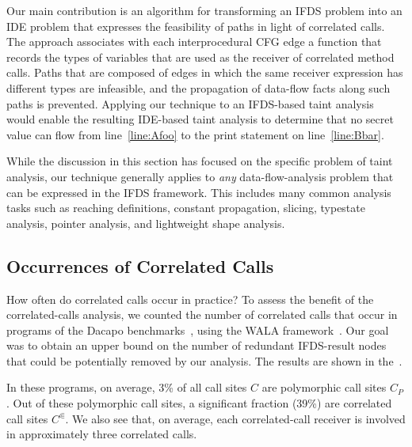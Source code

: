 Our main contribution is an algorithm for transforming an IFDS problem 
into an IDE problem that expresses the feasibility of paths
in light of correlated calls.
The approach associates with each interprocedural CFG edge 
a function that records the types of 
variables that are used as the receiver of correlated method calls. Paths that 
are composed of edges in which the same receiver expression has different types
are infeasible, and the propagation of data-flow facts along such paths is
prevented. Applying our technique to an IFDS-based taint analysis would enable
the resulting IDE-based taint analysis to determine that no secret value can flow from
line~\ref{line:Afoo} to the print statement on line~\ref{line:Bbar}. 

While the discussion in this section has focused on the specific problem of taint analysis,
our technique generally applies to \textit{any}
data-flow-analysis problem that can be expressed in the IFDS framework. This includes
many common analysis tasks such as reaching definitions, constant propagation, slicing,
typestate analysis, pointer analysis, and lightweight
shape analysis.

\subsection{Occurrences of Correlated Calls}\label{sec:occur}\paper{\vspace{-.5mm}}
How often do correlated calls occur in practice? To assess the benefit of the correlated-calls analysis, we counted the number of correlated calls that occur in programs of the Dacapo benchmarks~\cite{blackburn2006dacapo}, using the WALA framework~\cite{fink2012wala}.
Our goal was to obtain an upper bound on the number of redundant IFDS-result nodes that could be potentially removed by our analysis. The results are shown in the~\reportOrAppendix.

In these programs, on average, 3\% of all call sites $C$ are polymorphic call sites $C_P$.
Out of these polymorphic call sites, a significant fraction (39\%) are correlated 
call sites $C^\Subset$. We also see that, on average,  each correlated-call receiver is involved in approximately
three correlated calls. 


